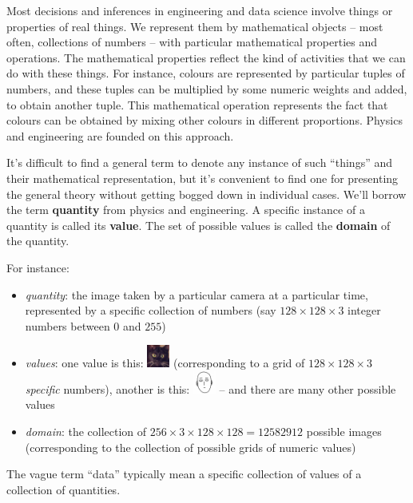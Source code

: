 \documentclass[
  a4paper,
  DIV=11,
  numbers=noendperiod,
  oneside]{scrreprt}
\providecommand{\tightlist}{%
  \setlength{\itemsep}{0pt}\setlength{\parskip}{0pt}}\usepackage{longtable,booktabs,array}
\begin{document}
Most decisions and inferences in engineering and data science involve
things or properties of real things. We represent them by mathematical
objects -- most often, collections of numbers -- with particular
mathematical properties and operations. The mathematical properties
reflect the kind of activities that we can do with these things. For
instance, colours are represented by particular tuples of numbers, and
these tuples can be multiplied by some numeric weights and added, to
obtain another tuple. This mathematical operation represents the fact
that colours can be obtained by mixing other colours in different
proportions. Physics and engineering are founded on this approach.

It's difficult to find a general term to denote any instance of such
``things'' and their mathematical representation, but it's convenient to
find one for presenting the general theory without getting bogged down
in individual cases. We'll borrow the term {\textbf{quantity}} from
physics and engineering. A specific instance of a quantity is called its
{\textbf{value}}. The set of possible values is called the
{\textbf{domain}} of the quantity.

For instance:

\begin{itemize}
\tightlist
\item
  \emph{quantity}: the image taken by a particular camera at a
  particular time, represented by a specific collection of numbers (say
  \(128\times128\times3\) integer numbers between \(0\) and \(255\))
\item
  \emph{values}: one value is this:
  \includegraphics[width=2em,height=\textheight]{cat_image.png}
  (corresponding to a grid of \(128\times128\times3\) \emph{specific}
  numbers), another is this:
  \includegraphics[width=2em,height=\textheight]{saitama_image.png} --
  and there are many other possible values
\item
  \emph{domain}: the collection of
  \(256\times3\times128\times128 = 12 582 912\) possible images
  (corresponding to the collection of possible grids of numeric values)
\end{itemize}

The vague term ``data'' typically mean a specific collection of values
of a collection of quantities.
\end{document}
